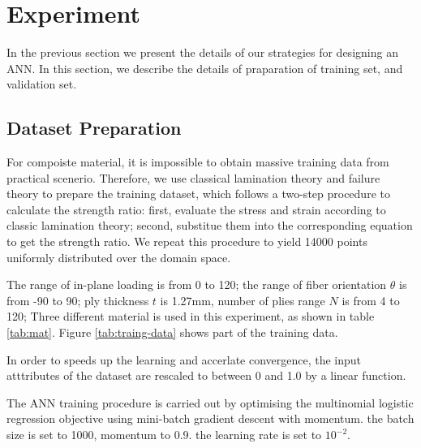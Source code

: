 \section{Experiment}
In the previous section we present the details of our strategies for designing an ANN. In
this section, we describe the details of praparation of training set, and validation set.
\subsection{Dataset Preparation}
For compoiste material, it is impossible to obtain massive training data from
practical scenerio.  Therefore, we use classical lamination theory and failure
theory to prepare the training dataset, which follows a two-step procedure to
calculate the strength ratio: first, evaluate the stress and strain according
to classic lamination theory; second, substitue them into the corresponding
equation to get the strength ratio. We repeat this procedure to yield 14000
points uniformly distributed over the domain space.

The range of in-plane loading is from 0 to 120; the range of fiber orientation $\theta$ is from
-90 to 90; ply thickness $t$ is 1.27mm, number of plies range $N$ is from 4 to 120;
Three different material is used in this experiment, as shown in table \ref{tab:mat}.
Figure \ref{tab:traing-data} shows part of the training data.

In order to speeds up the learning and accerlate convergence, the input
atttributes of the dataset are rescaled to between 0 and 1.0 by a linear function.





The ANN training procedure is carried out by optimising the multinomial
logistic regression objective using mini-batch gradient descent\cite{lecun1989backpropagation} with momentum. the batch size is set to 1000,
momentum to 0.9. the learning rate is set to $10^{-2}$.

